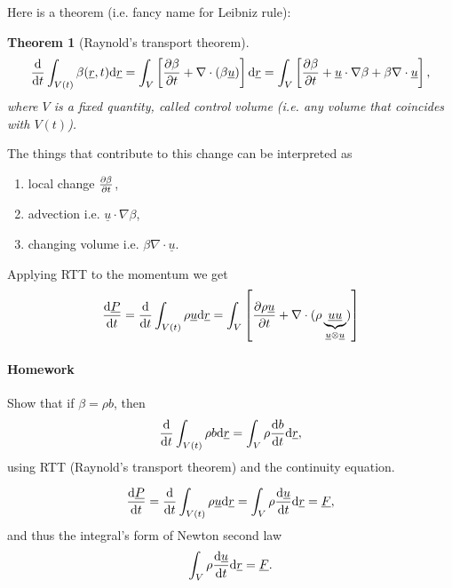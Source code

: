 \documentclass[11pt,oneside]{book}
\renewcommand{\vec}[1]{\underline{#1}}
\theoremstyle{definition} %
\theoremstyle{plain} %
\newtheorem{theorem}{Theorem}[section]
\theoremstyle{remark} %
\theoremstyle{underline}
\begin{document}
  Here is a theorem (i.e. fancy name for Leibniz rule):
  
  \begin{theorem}[Raynold's transport theorem]
    \begin{displaymath}
      \dfrac{}{t} \int_{V(t)} \beta (\vec r, t) \d \vec r = 
      \int_{V}\left[ \ptf{\beta}{t} + \nabla \cdot (\beta \vec u) \right] \d \vec r
      = \int_V \left[ \ptf{\beta}{t} + \vec u \cdot \nabla \beta + \beta \nabla \cdot \vec u \right]
      ,
    \end{displaymath}
    where $V$ is a fixed quantity, called control volume (i.e. any volume that coincides with $V(t)$).
  \end{theorem}

  The things that contribute to this change can be interpreted as
  \begin{enumerate}
    \item local change $\frac{\partial \beta}{\partial t}$,
    \item advection i.e. $\vec u \cdot \nabla \beta$,
    \item changing volume i.e. $\beta \nabla\cdot \vec u$.
  \end{enumerate}

  Applying RTT to the momentum we get
  \begin{displaymath}
    \dfrac{\vec P }{t} = \dfrac{}{t} \int_{V(t)} \rho \vec u \d \vec r 
    = \int_V \left[ \ptf{\rho\vec u }{t} + \nabla \cdot (\rho \underbrace{\vec u \vec u}_{\vec u \otimes \vec u}) \right]
  \end{displaymath}
  
  \paragraph{Homework} Show that if $\beta = \rho b$, then 
  \begin{displaymath}
    \dfrac{}{t} \int_{V(t)} \rho b \d \vec r = \int_{V} \rho \dfrac{b}{t} \d \vec r,
  \end{displaymath}
  using RTT (Raynold's transport theorem) and the continuity equation.
  
  \begin{displaymath}
    \dfrac{\vec P}{t} = \dfrac{}{t} \int_{V(t)} \rho \vec u \d \vec r 
    = \int_V \rho \dfrac{\vec u}{t} \d \vec r 
    = \vec F,
  \end{displaymath}
  and thus the integral's form of Newton second law
  \begin{displaymath}
    \int_V \rho \dfrac{\vec u}{t} \d \vec r = \vec F.
  \end{displaymath}
  
\end{document}
